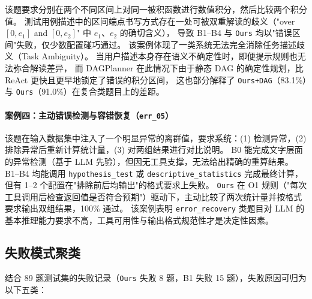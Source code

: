 该题要求分别在两个不同区间上对同一被积函数进行数值积分，然后比较两个积分值。
测试用例描述中的区间端点书写方式存在一处可被双重解读的歧义（"over $[0, e_1]$ and $[0, e_2]$" 中 $e_1$、$e_2$ 的确切含义），
导致 B1--B4 与 \texttt{Ours} 均以"错误区间"失败，仅少数配置碰巧通过。
该案例体现了一类系统无法完全消除任务描述歧义（Task Ambiguity）。
当用户描述本身存在语义不确定性时，即便提示规则也无法弥合解读差异，
而 DAGPlanner 在此情况下由于静态 DAG 的确定性规划，比 ReAct 更快且更早地锁定了错误的积分区间，
这也部分解释了 \texttt{Ours+DAG}（83.1\%）与 \texttt{Ours}（91.0\%）在复合类题目上的差距。

\paragraph{案例四：主动错误检测与容错恢复（\texttt{err\_05}）}

该题在输入数据集中注入了一个明显异常的离群值，要求系统：(1) 检测异常，(2) 排除异常后重新计算统计量，(3) 对两组结果进行对比说明。
B0 能完成文字层面的异常检测（基于 LLM 先验），但因无工具支撑，无法给出精确的重算结果。
B1--B4 均能调用 \texttt{hypothesis\_test} 或 \texttt{descriptive\_statistics} 完成最终计算，但有 1--2 个配置在"排除前后均输出"的格式要求上失败。
\texttt{Ours} 在 O1 规则（"每次工具调用后检查返回值是否符合预期"）驱动下，主动比较了两次统计量并按格式要求输出双组结果，100\% 通过。
该案例表明 \texttt{error\_recovery} 类题目对 LLM 的基本推理能力要求不高，工具可用性与输出格式规范性才是决定性因素。

\subsection{失败模式聚类}\label{sec:analysis-failure}

结合 89 题测试集的失败记录（\texttt{Ours} 失败 8 题，B1 失败 15 题），失败原因可归为以下五类：

